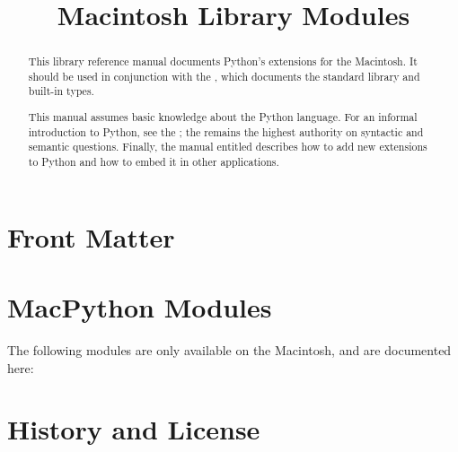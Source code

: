 \documentclass{manual}
\title{Macintosh Library Modules}
\begin{document}
\maketitle

\ifhtml
\chapter*{Front Matter\label{front}}
\fi



\begin{abstract}

\noindent
This library reference manual documents Python's extensions for the
Macintosh.  It should be used in conjunction with the
, which documents
the standard library and built-in types.

This manual assumes basic knowledge about the Python language.  For an
informal introduction to Python, see the
; the
 remains the
highest authority on syntactic and semantic questions.  Finally, the
manual entitled  describes how to add new extensions to Python
and how to embed it in other applications.

\end{abstract}

\tableofcontents




\chapter{MacPython Modules \label{macpython-modules}}

The following modules are only available on the Macintosh, and are
documented here:

\localmoduletable














\appendix
\chapter{History and License}


%
%

\renewcommand{\indexname}{Module Index}

\renewcommand{\indexname}{Index}
\end{document}
